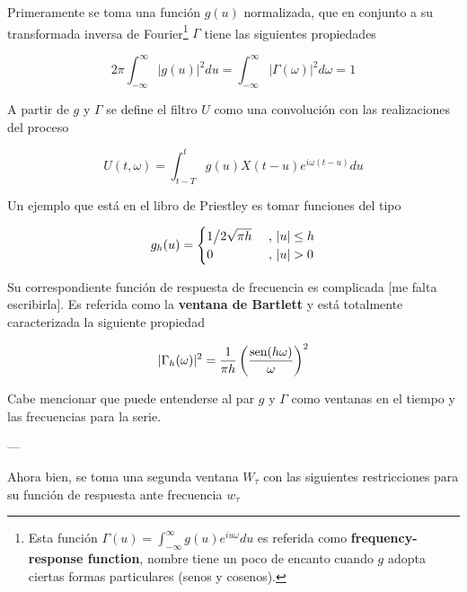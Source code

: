 Primeramente se toma una funci\'on $g(u)$ normalizada, que en conjunto a su
transformada inversa de Fourier\footnote{Esta funci\'on 
$\Gamma(u) = \int_{-\infty}^{\infty} g(u) e^{i u \omega} du$
es referida como
\textbf{frequency-response function}, nombre tiene un poco de encanto cuando
$g$ adopta ciertas formas particulares (senos y cosenos).} 
$\Gamma$ tiene las siguientes propiedades

\begin{equation*}
2\pi \int_{-\infty}^{\infty} \lvert g(u) \lvert^{2} du 
= 
\int_{-\infty}^{\infty} \lvert \Gamma(\omega) \lvert^{2} d\omega
= 1
\end{equation*}


A partir de $g$ y $\Gamma$ se define el filtro $U$ como una convoluci\'on
con las realizaciones del proceso

\begin{equation*}
U(t,\omega) = \int_{t-T}^{t} g(u) X({t-u}) e^{i \omega (t-u)} du
\end{equation*}

Un ejemplo que est\'a en el libro de Priestley es tomar funciones del tipo

\begin{equation*}
g_h(u) = 
\begin{cases}
{1 \big{/} 2\sqrt{\pi h}} & \text{ , } \lvert u \rvert \leq h
\\
0 & \text{ , } \lvert u \rvert > 0
\end{cases}
\end{equation*}

Su correspondiente funci\'on de respuesta de frecuencia es complicada [me falta 
escribirla]. Es referida como la \textbf{ventana de Bartlett} y
est\'a totalmente caracterizada la siguiente propiedad

\begin{equation*}
\lvert \Gamma_h(\omega) \rvert^{2} = \frac{1}{\pi h} \left( \frac{\text{sen} (h \omega)}{\omega} \right)^{2}
\end{equation*}

Cabe mencionar que puede entenderse al par $g$ y $\Gamma$ como ventanas en el tiempo
y las frecuencias para la serie.

---

Ahora bien, se toma una segunda ventana $W_\tau$ con las siguientes
restricciones para
su funci\'on de respuesta ante frecuencia $w_\tau$

